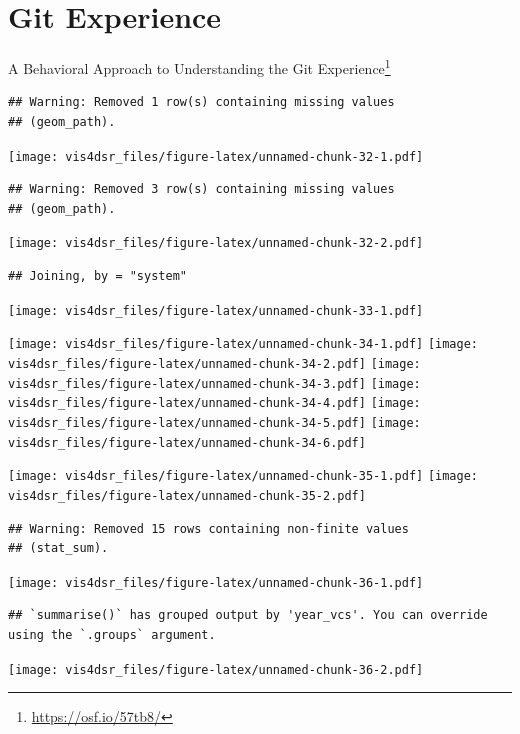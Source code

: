 \documentclass[
]{krantz}
\renewcommand{\href}[2]{#2\footnote{\url{#1}}}
\begin{document}
\hypertarget{git-experience}{%
\section*{Git Experience}\label{git-experience}}


\href{https://osf.io/57tb8/}{A Behavioral Approach to Understanding the Git Experience}

\begin{verbatim}
## Warning: Removed 1 row(s) containing missing values
## (geom_path).
\end{verbatim}

\texttt{[image: vis4dsr\_files/figure-latex/unnamed-chunk-32-1.pdf]}

\begin{verbatim}
## Warning: Removed 3 row(s) containing missing values
## (geom_path).
\end{verbatim}

\texttt{[image: vis4dsr\_files/figure-latex/unnamed-chunk-32-2.pdf]}

\begin{verbatim}
## Joining, by = "system"
\end{verbatim}

\texttt{[image: vis4dsr\_files/figure-latex/unnamed-chunk-33-1.pdf]}

\texttt{[image: vis4dsr\_files/figure-latex/unnamed-chunk-34-1.pdf]} \texttt{[image: vis4dsr\_files/figure-latex/unnamed-chunk-34-2.pdf]} \texttt{[image: vis4dsr\_files/figure-latex/unnamed-chunk-34-3.pdf]} \texttt{[image: vis4dsr\_files/figure-latex/unnamed-chunk-34-4.pdf]} \texttt{[image: vis4dsr\_files/figure-latex/unnamed-chunk-34-5.pdf]} \texttt{[image: vis4dsr\_files/figure-latex/unnamed-chunk-34-6.pdf]}

\texttt{[image: vis4dsr\_files/figure-latex/unnamed-chunk-35-1.pdf]} \texttt{[image: vis4dsr\_files/figure-latex/unnamed-chunk-35-2.pdf]}

\begin{verbatim}
## Warning: Removed 15 rows containing non-finite values
## (stat_sum).
\end{verbatim}

\texttt{[image: vis4dsr\_files/figure-latex/unnamed-chunk-36-1.pdf]}

\begin{verbatim}
## `summarise()` has grouped output by 'year_vcs'. You can override using the `.groups` argument.
\end{verbatim}

\texttt{[image: vis4dsr\_files/figure-latex/unnamed-chunk-36-2.pdf]}
\end{document}
